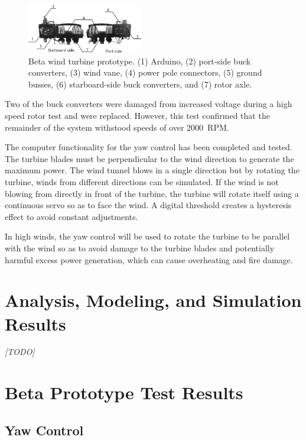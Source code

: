 \documentclass[11pt,letterpaper,conference]{IEEEtran}
\begin{document}
\begin{figure}[th]
    \centering
    \includegraphics[width=0.45\textwidth]{images/prototype.png}
    \caption{Beta wind turbine prototype. (1) Arduino, (2) port-side buck
        converters, (3) wind vane, (4) power pole connectors, (5) ground busses,
        (6) starboard-side buck converters, and (7) rotor axle.}
    \label{img:prototype}
\end{figure}

Two of the buck converters were damaged from increased voltage during a high
speed rotor test and were replaced. However, this test confirmed that the
remainder of the system withstood speeds of over \qty{2000}{RPM}.

The computer functionality for the yaw control has been completed and tested.
The turbine blades must be perpendicular to the wind direction to generate the
maximum power. The wind tunnel blows in a single direction but by rotating the
turbine, winds from different directions can be simulated. If the wind is not
blowing from directly in front of the turbine, the turbine will rotate itself
using a continuous servo so as to face the wind. A digital threshold creates a
hysteresis effect to avoid constant adjustments.

In high winds, the yaw control will be used to rotate the turbine to be parallel
with the wind so as to avoid damage to the turbine blades and potentially
harmful excess power generation, which can cause overheating and fire damage.

\section{Analysis, Modeling, and Simulation Results}

\emph{[TODO]}

\section{Beta Prototype Test Results}
\subsection{Yaw Control}
\label{sec:yaw_control}
\end{document}
